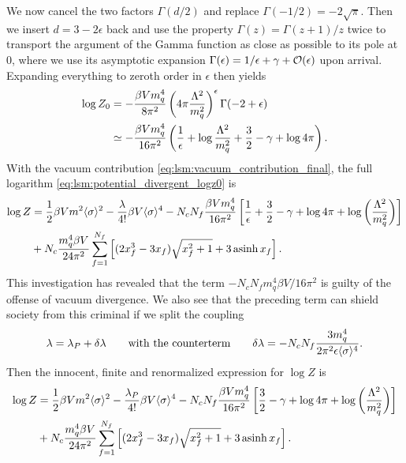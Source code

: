 We now cancel the two factors $\Gamma(d/2)$ and replace $\Gamma(-1/2) = -2\sqrt{\pi}$.
Then we insert $d = 3 - 2 \epsilon$ back and use the property $\Gamma(z) = \Gamma(z+1) / z$ twice to transport the argument of the Gamma function as close as possible to its pole at $0$,
where we use its asymptotic expansion $\Gamma(\epsilon) = 1/\epsilon + \gamma + \mathcal{O}(\epsilon)$ upon arrival.
Expanding everything to zeroth order in $\epsilon$ then yields
\begin{equation}
\begin{split}
	\log Z_0 &=       -\frac{\beta V m_q^4}{8 \pi^2} \left( 4 \pi \frac{\Lambda^2}{m_q^2} \right)^\epsilon \Gamma(-2 + \epsilon) \\
	         &\simeq -\frac{\beta V m_q^4}{16 \pi^2} \left( \frac{1}{\epsilon} + \log \frac{\Lambda^2}{m_q^2} + \frac32 - \gamma + \log 4 \pi \right) .
\end{split}
\label{eq:lsm:vacuum_contribution_final}
\end{equation}
With the vacuum contribution \eqref{eq:lsm:vacuum_contribution_final}, the full logarithm \eqref{eq:lsm:potential_divergent_logz0} is
\begin{equation}
\begin{split}
	\log Z &= \frac12 \beta V m^2 \langle \sigma \rangle^2 - \frac{\lambda}{4!} \beta V \langle \sigma \rangle^4 - N_c N_f \frac{\beta V m_q^4}{16 \pi^2} \left[ \frac{1}{\epsilon} + \frac{3}{2} - \gamma + \log 4 \pi + \log\left(\frac{{\Lambda}^2}{m_q^2}\right) \right] \\
	       &+ N_c \frac{m_q^4 \beta V}{24 \pi^2} \sum_{f=1}^{N_f} \left[ (2 x_f^3 - 3x_f) \sqrt{x_f^2 + 1} + 3 \operatorname{asinh} x_f \right] .
\end{split}
\end{equation}
This investigation has revealed that the term $-N_c N_f m_q^4 \beta V / 16 \pi^2$ is guilty of the offense of vacuum divergence.
We also see that the preceding term can shield society from this criminal if we split the coupling 
\begin{equation}
	\lambda = \lambda_P + \delta\lambda
	\qquad \text{with the counterterm} \qquad
	\delta\lambda = -N_c N_f \frac{3 m_q^4}{2 \pi^2 \epsilon \langle \sigma \rangle^4} .
\end{equation}
Then the innocent, finite and renormalized expression for $\log Z$ is
\begin{equation}
\begin{split}
	\log Z &= \frac12 \beta V m^2 \langle \sigma \rangle^2 - \frac{\lambda_P}{4!} \beta V \langle \sigma \rangle^4 - N_c N_f \frac{\beta V m_q^4}{16 \pi^2} \left[ \frac{3}{2} - \gamma + \log 4 \pi + \log\left(\frac{{\Lambda}^2}{m_q^2}\right) \right] \\
	       &+ N_c \frac{m_q^4 \beta V}{24 \pi^2} \sum_{f=1}^{N_f} \left[ (2 x_f^3 - 3x_f) \sqrt{x_f^2 + 1} + 3 \operatorname{asinh} x_f \right] .
\end{split}
\end{equation}
